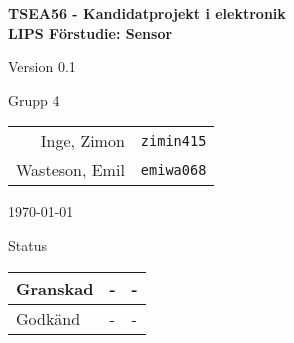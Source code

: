 \documentclass[11pt]{article}
\begin{document}
\begin{titlepage}
\begin{center}

{\Large\bfseries TSEA56 - Kandidatprojekt i elektronik \\ LIPS Förstudie: Sensor}

\vspace{5em}

Version 0.1

\vspace{5em}
Grupp 4 \\
\begin{tabular}{rl}
Inge, Zimon&\verb+zimin415+
\\
Wasteson, Emil&\verb+emiwa068+
\\

\end{tabular}

\vspace{5em}
\today

\vspace{16em}
Status
\begin{longtable}{|l|l|l|} \hline

Granskad & - & - \\ \hline
Godkänd & - & - \\ \hline
 
\end{longtable}


\end{center}
\end{titlepage}
\end{document}
